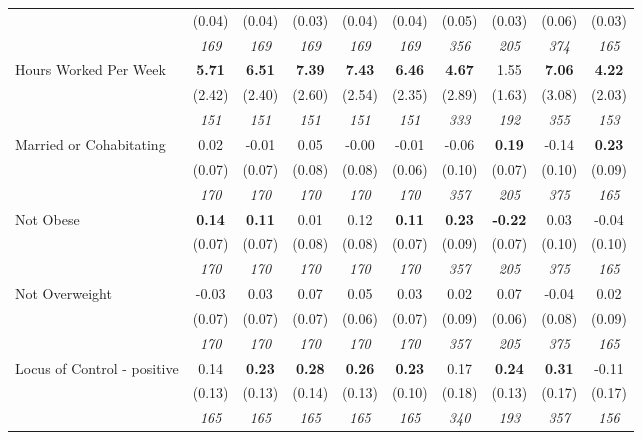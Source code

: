 \begin{tabular}{l c c c c c c c c c}
& (0.04) & (0.04) & (0.03) & (0.04) & (0.04) & (0.05) & (0.03) & (0.06) & (0.03) \\
& \textit{ 169 } & \textit{ 169 } & \textit{ 169 } & \textit{ 169 } & \textit{ 169 } & \textit{ 356 } & \textit{ 205 } & \textit{ 374 } & \textit{ 165 } \\
Hours Worked Per Week & \textbf{ 5.71 } & \textbf{ 6.51 } & \textbf{ 7.39 } & \textbf{7.43} & \textbf{6.46} & \textbf{ 4.67 } & 1.55 & \textbf{ 7.06 } & \textbf{4.22} \\
& (2.42) & (2.40) & (2.60) & (2.54) & (2.35) & (2.89) & (1.63) & (3.08) & (2.03) \\
& \textit{ 151 } & \textit{ 151 } & \textit{ 151 } & \textit{ 151 } & \textit{ 151 } & \textit{ 333 } & \textit{ 192 } & \textit{ 355 } & \textit{ 153 } \\
Married or Cohabitating & 0.02 & -0.01 & 0.05 & -0.00 & -0.01 & -0.06 & \textbf{0.19} & -0.14 & \textbf{0.23} \\
& (0.07) & (0.07) & (0.08) & (0.08) & (0.06) & (0.10) & (0.07) & (0.10) & (0.09) \\
& \textit{ 170 } & \textit{ 170 } & \textit{ 170 } & \textit{ 170 } & \textit{ 170 } & \textit{ 357 } & \textit{ 205 } & \textit{ 375 } & \textit{ 165 } \\
Not Obese & \textbf{ 0.14 } & \textbf{ 0.11 } & 0.01 & 0.12 & \textbf{0.11} & \textbf{ 0.23 } & \textbf{-0.22} & 0.03 & -0.04 \\
& (0.07) & (0.07) & (0.08) & (0.08) & (0.07) & (0.09) & (0.07) & (0.10) & (0.10) \\
& \textit{ 170 } & \textit{ 170 } & \textit{ 170 } & \textit{ 170 } & \textit{ 170 } & \textit{ 357 } & \textit{ 205 } & \textit{ 375 } & \textit{ 165 } \\
Not Overweight & -0.03 & 0.03 & 0.07 & 0.05 & 0.03 & 0.02 & 0.07 & -0.04 & 0.02 \\
& (0.07) & (0.07) & (0.07) & (0.06) & (0.07) & (0.09) & (0.06) & (0.08) & (0.09) \\
& \textit{ 170 } & \textit{ 170 } & \textit{ 170 } & \textit{ 170 } & \textit{ 170 } & \textit{ 357 } & \textit{ 205 } & \textit{ 375 } & \textit{ 165 } \\
Locus of Control - positive & 0.14 & \textbf{ 0.23 } & \textbf{ 0.28 } & \textbf{0.26} & \textbf{0.23} & 0.17 & \textbf{0.24} & \textbf{ 0.31 } & -0.11 \\
& (0.13) & (0.13) & (0.14) & (0.13) & (0.10) & (0.18) & (0.13) & (0.17) & (0.17) \\
& \textit{ 165 } & \textit{ 165 } & \textit{ 165 } & \textit{ 165 } & \textit{ 165 } & \textit{ 340 } & \textit{ 193 } & \textit{ 357 } & \textit{ 156 } \\

\end{tabular}
